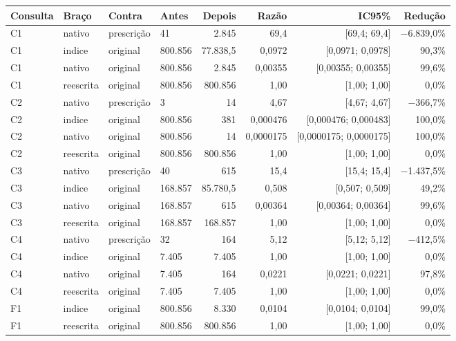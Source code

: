 {\footnotesize\setlength{\tabcolsep}{4pt}
\begin{tabular}{llllrrrr}
\toprule
Consulta & Braço & Contra & Antes & Depois & Razão & IC95\% & Redução \\
\midrule
C1 & nativo & prescrição & 41 & 2.845 & 69,4 & [69,4; 69,4] & $-$6.839,0\% \\
C1 & indice & original & 800.856 & 77.838,5 & 0,0972 & [0,0971; 0,0978] & 90,3\% \\
C1 & nativo & original & 800.856 & 2.845 & 0,00355 & [0,00355; 0,00355] & 99,6\% \\
C1 & reescrita & original & 800.856 & 800.856 & 1,00 & [1,00; 1,00] & 0,0\% \\
C2 & nativo & prescrição & 3 & 14 & 4,67 & [4,67; 4,67] & $-$366,7\% \\
C2 & indice & original & 800.856 & 381 & 0,000476 & [0,000476; 0,000483] & 100,0\% \\
C2 & nativo & original & 800.856 & 14 & 0,0000175 & [0,0000175; 0,0000175] & 100,0\% \\
C2 & reescrita & original & 800.856 & 800.856 & 1,00 & [1,00; 1,00] & 0,0\% \\
C3 & nativo & prescrição & 40 & 615 & 15,4 & [15,4; 15,4] & $-$1.437,5\% \\
C3 & indice & original & 168.857 & 85.780,5 & 0,508 & [0,507; 0,509] & 49,2\% \\
C3 & nativo & original & 168.857 & 615 & 0,00364 & [0,00364; 0,00364] & 99,6\% \\
C3 & reescrita & original & 168.857 & 168.857 & 1,00 & [1,00; 1,00] & 0,0\% \\
C4 & nativo & prescrição & 32 & 164 & 5,12 & [5,12; 5,12] & $-$412,5\% \\
C4 & indice & original & 7.405 & 7.405 & 1,00 & [1,00; 1,00] & 0,0\% \\
C4 & nativo & original & 7.405 & 164 & 0,0221 & [0,0221; 0,0221] & 97,8\% \\
C4 & reescrita & original & 7.405 & 7.405 & 1,00 & [1,00; 1,00] & 0,0\% \\
F1 & indice & original & 800.856 & 8.330 & 0,0104 & [0,0104; 0,0104] & 99,0\% \\
F1 & reescrita & original & 800.856 & 800.856 & 1,00 & [1,00; 1,00] & 0,0\% \\

\end{tabular}}
